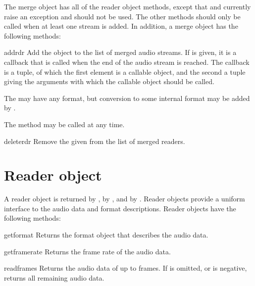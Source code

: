 The merge object has all of the reader object methods, except that
 and  currently raise an exception and
should not be used.  The other methods should only be called when at
least one stream is added.  In addition, a merge object has the
following methods:
\renewcommand{\indexsubitem}{(audiomerge object methods)}

\begin{funcdesc}{add}{rdr}
Add the  object to the list of merged audio streams.  If
 is given, it is a callback that is called when the end
of the audio stream is reached.  The callback is a tuple, of which the
first element is a callable object, and the second a tuple giving the
arguments with which the callable object should be called.

The  may have any format, but conversion to some internal
format may be added by .

The  method may be called at any time.
\end{funcdesc}

\begin{funcdesc}{delete}{rdr}
Remove the given  from the list of merged readers.
\end{funcdesc}

\section{Reader object}
\renewcommand{\indexsubitem}{(reader object methods)}

A reader object is returned by , by
, and by .
Reader objects provide a uniform interface to the audio data and
format descriptions.  Reader objects have the following methods:

\begin{funcdesc}{getformat}{}
Returns the format object that describes the audio data.
\end{funcdesc}

\begin{funcdesc}{getframerate}{}
Returns the frame rate of the audio data.
\end{funcdesc}

\begin{funcdesc}{readframes}{}
Returns the audio data of up to  frames.  If 
is omitted, or is negative, returns all remaining audio data.
\end{funcdesc}

